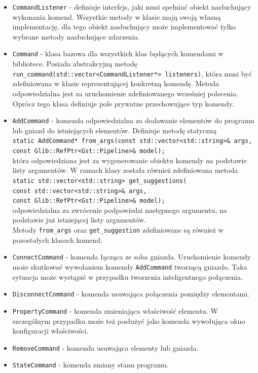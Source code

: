 \documentclass[12pt]{article}
\begin{document}
\begin{itemize}
 \setlength{\itemsep}{0em}
\item \texttt{CommandListener} - definiuje interfejs, jaki musi spełniać obiekt nasłuchujący wykonania komend. Wszystkie metody w klasie mają swoją własną implementację, dla tego obiekt nasłuchujący może implementować tylko wybrane metody nasłuchujące zdarzenia.
\item \texttt{Command} - klasa bazowa dla wszystkich klas będących komendami w bibliotece. Posiada abstrakcyjną metodę \\\texttt{run\_command(std::vector<CommandListener*> listeners)}, która musi być zdefiniowana w klasie reprezentującej konkretną komendę. Metoda odpowiedzialna jest za uruchomienie zdefiniowanego wcześniej polecenia. Oprócz tego klasa definiuje pole prywatne przechowujące typ komendy.
\item \texttt{AddCommand} - komenda odpowiedzialna za dodawanie elementów do programu lub gniazd do istniejących elementów. Definiuje metodę statyczną \\
\texttt{static AddCommand* from\_args(const std::vector<std::string>\& args, \\const Glib::RefPtr<Gst::Pipeline>\& model);}\\
która odpowiedziana jest za wygenerowanie obiektu komendy na podstawie listy argumentów.
W ramach klasy została również zdefiniowana metoda \\
\texttt{static std::vector<std::string> get\_suggestions(\\const std::vector<std::string>\& args, \\const Glib::RefPtr<Gst::Pipeline>\& model);}\\
odpowiedzialna za zwrócenie podpowiedzi następnego argumentu, na podstawie już istniejącej listy argumentów.\\
Metody \texttt{from\_args} oraz \texttt{get\_suggestion} zdefiniowane są również w pozostałych klasach komend.
\item \texttt{ConnectCommand} - komenda łącząca ze soba gniazda. Uruchomienie komendy może skutkować wywołaniem komendy \texttt{AddCommand} tworzącą gniazdo. Taka sytuacja może wystąpić w przypadku tworzenia inteligentnego połączenia.
\item \texttt{DisconnectCommand} - komenda usuwająca połączenia pomiędzy elementami.
\item \texttt{PropertyCommand} - komenda zmieniająca właściwość elementu. W szczególnym przypadku może też posłużyć jako komenda wywołująca okno konfiguracji właściwości.
\item \texttt{RemoveCommand} - komenda usuwająca elementy lub gniazda.
\item \texttt{StateCommand} - komenda zmiany stanu programu.
\end{itemize}
\end{document}
